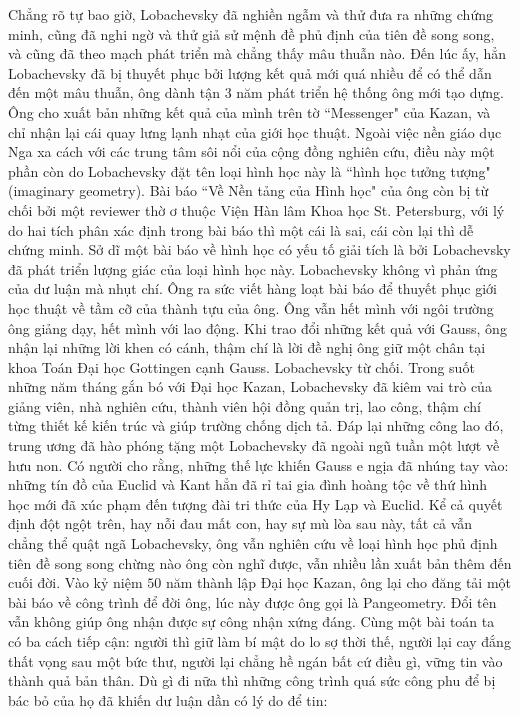 \begin{multicols}{2}
	\vskip 0.1cm
	Chẳng rõ tự bao giờ, Lobachevsky đã nghiền ngẫm và thử đưa ra những chứng minh, cũng đã nghi ngờ và thử giả sử mệnh đề phủ định của tiên đề song song, và cũng đã theo mạch phát triển mà chẳng thấy mâu thuẫn nào. Đến lúc ấy, hẳn Lobachevsky đã bị thuyết phục bởi lượng kết quả mới quá nhiều để có thể dẫn đến một mâu thuẫn, ông dành tận $3$ năm phát triển hệ thống ông mới tạo dựng. Ông cho xuất bản những kết quả của mình trên tờ ``Messenger" của Kazan, và chỉ nhận lại cái quay lưng lạnh nhạt của giới học thuật. Ngoài việc nền giáo dục Nga xa cách với các trung tâm sôi nổi của cộng đồng nghiên cứu, điều này một phần còn do Lobachevsky đặt tên loại hình học này là ``hình học tưởng tượng" (imaginary geometry). Bài báo ``Về Nền tảng của Hình học" của ông còn bị từ chối bởi một reviewer thờ ơ thuộc Viện Hàn lâm Khoa học St. Petersburg, với lý do hai tích phân xác định trong bài báo thì một cái là sai, cái còn lại thì dễ chứng minh. Sở dĩ một bài báo về hình học có yếu tố giải tích là bởi Lobachevsky đã phát triển lượng giác của loại hình học này.
	\vskip 0.1cm
	Lobachevsky không vì phản ứng của dư luận mà nhụt chí. Ông ra sức viết hàng loạt bài báo để thuyết phục giới học thuật về tầm cỡ của thành tựu của ông. Ông vẫn hết mình với ngôi trường ông giảng dạy, hết mình với lao động. Khi trao đổi những kết quả với Gauss, ông nhận lại những lời khen có cánh, thậm chí là lời đề nghị ông giữ một chân tại khoa Toán Đại học Gottingen cạnh Gauss. Lobachevsky từ chối. Trong suốt những năm tháng gắn bó với Đại học Kazan, Lobachevsky đã kiêm vai trò của giảng viên, nhà nghiên cứu, thành viên hội đồng quản trị, lao công, thậm chí từng thiết kế kiến trúc và giúp trường chống dịch tả.
	\vskip 0.1cm
	Đáp lại những công lao đó, trung ương đã hào phóng tặng một Lobachevsky đã ngoài ngũ tuần một lượt về hưu non. Có người cho rằng, những thế lực khiến Gauss e ngịa đã nhúng tay vào: những tín đồ của Euclid và Kant hẳn đã rỉ tai gia đình hoàng tộc về thứ hình học mới đã xúc phạm đến tượng đài tri thức của  Hy Lạp và Euclid. Kể cả quyết định đột ngột trên, hay nỗi đau mất con, hay sự mù lòa sau này, tất cả vẫn chẳng thể quật ngã Lobachevsky, ông vẫn nghiên cứu về loại hình học phủ định tiên đề song song chừng nào ông còn nghĩ được, vẫn nhiều lần xuất bản thêm đến cuối đời. Vào kỷ niệm $50$ năm thành lập Đại học Kazan, ông lại cho đăng tải một bài báo về công trình để đời ông, lúc này được ông gọi là Pangeometry. Đổi tên vẫn không giúp ông nhận được sự công nhận xứng đáng.
	\vskip 0.1cm
	Cùng một bài toán ta có ba cách tiếp cận: người thì giữ làm bí mật do lo sợ thời thế, người lại cay đắng thất vọng sau một bức thư, người lại chẳng hề ngán bất cứ điều gì, vững tin vào thành quả bản thân. Dù gì đi nữa thì những công trình quá sức công phu để bị bác bỏ của họ đã khiến dư luận dần có lý do để tin:

\end{multicols}
